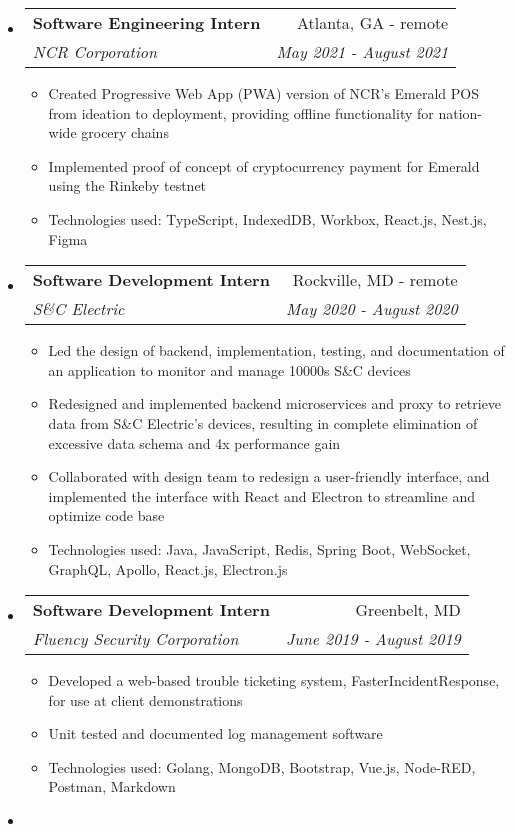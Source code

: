 \documentclass[letterpaper,10pt]{article}
\makeatletter
\newcommand{\resitem}[1]{\item #1 \vspace{-2pt}}
\newcommand{\ressubheading}[4]{
\begin{tabular*}{7.0in}{l@{\extracolsep{\fill}}r}
		\textbf{#1} & #2 \\
		\textit{#3} & \textit{#4} \\
\end{tabular*}\vspace{-6pt}}
\makeatother
\begin{document}
\begin{itemize}
\item
    \ressubheading{Software Engineering Intern}{Atlanta, GA - remote}{NCR Corporation}{May 2021 - August 2021}
    \begin{itemize}
        \resitem{Created Progressive Web App (PWA) version of NCR's Emerald POS from ideation to deployment, providing offline functionality for nation-wide grocery chains}
        \resitem{Implemented proof of concept of cryptocurrency payment for Emerald using the Rinkeby testnet}
        \resitem{Technologies used: TypeScript, IndexedDB, Workbox, React.js, Nest.js, Figma}
    \end{itemize}
\item
    \ressubheading{Software Development Intern}{Rockville, MD - remote}{S\&C Electric}{May 2020 - August 2020}
    \begin{itemize}
        \resitem{Led the design of backend, implementation, testing, and documentation of an application to monitor and manage 10000s S\&C devices}
        \resitem{Redesigned and implemented backend microservices and proxy to retrieve data from S\&C Electric's devices, resulting in complete elimination of excessive data schema and 4x performance gain}
        \resitem{Collaborated with design team to redesign a user-friendly interface, and implemented the interface with React and Electron to streamline and optimize code base}
        \resitem{Technologies used: Java, JavaScript, Redis, Spring Boot, WebSocket, GraphQL, Apollo, React.js, Electron.js}
    \end{itemize}
\item
    \ressubheading{Software Development Intern}{Greenbelt, MD}{Fluency Security Corporation}{June 2019 - August 2019}
	\begin{itemize}
	    \resitem{Developed a web-based trouble ticketing system, FasterIncidentResponse, for use at client demonstrations}
		\resitem{Unit tested and documented log management software}
		\resitem{Technologies used: Golang, MongoDB, Bootstrap, Vue.js, Node-RED, Postman, Markdown}
	\end{itemize}
\item

\end{itemize}
\end{document}
